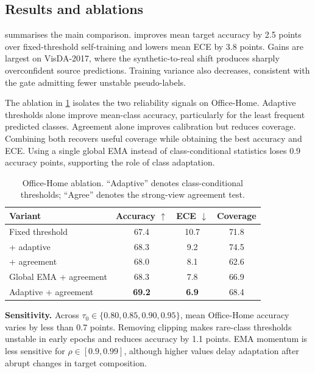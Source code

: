 \subsection{Results and ablations}

 summarises the main comparison. \method{} improves mean target
accuracy by 2.5 points over fixed-threshold self-training and lowers mean ECE by
3.8 points. Gains are largest on VisDA-2017, where the synthetic-to-real shift
produces sharply overconfident source predictions. Training variance also
decreases, consistent with the gate admitting fewer unstable pseudo-labels.

The ablation in \cref{tab:ablation} isolates the two reliability signals on
Office-Home. Adaptive thresholds alone improve mean-class accuracy, particularly
for the least frequent predicted classes. Agreement alone improves calibration
but reduces coverage. Combining both recovers useful coverage while obtaining
the best accuracy and ECE. Using a single global EMA instead of class-conditional
statistics loses 0.9 accuracy points, supporting the role of class adaptation.

\begin{table}[t]
  \centering
  \caption{Office-Home ablation. ``Adaptive'' denotes class-conditional
  thresholds; ``Agree'' denotes the strong-view agreement test.}
  \label{tab:ablation}
  \small
  \begin{tabular}{@{}lccc@{}}
    \toprule
    Variant & Accuracy $\uparrow$ & ECE $\downarrow$ & Coverage \\
    \midrule
    Fixed threshold          & 67.4 & 10.7 & 71.8 \\
    + adaptive               & 68.3 &  9.2 & 74.5 \\
    + agreement              & 68.0 &  8.1 & 62.6 \\
    Global EMA + agreement   & 68.3 &  7.8 & 66.9 \\
    Adaptive + agreement     & \textbf{69.2} & \textbf{6.9} & 68.4 \\
    \bottomrule
  \end{tabular}
\end{table}

\textbf{Sensitivity.}
Across $\tau_0\in\{0.80,0.85,0.90,0.95\}$, mean Office-Home accuracy varies by
less than 0.7 points. Removing clipping makes rare-class thresholds unstable in
early epochs and reduces accuracy by 1.1 points. EMA momentum is less sensitive
for $\rho\in[0.9,0.99]$, although higher values delay adaptation after abrupt
changes in target composition.

